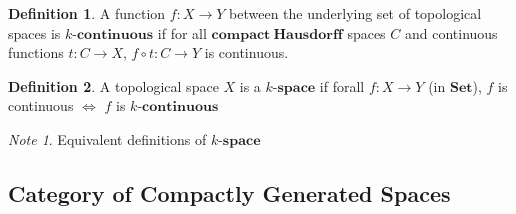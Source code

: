 \documentclass[a4paper]{article}
\theoremstyle{plain}
\theoremstyle{definition}
\newtheorem{defn}{Definition}[section]
\theoremstyle{remark}
\newtheorem*{note}{Note}
\newcommand{\mbf}[1]{\mathbf{#1}}
\begin{document}
    \begin{defn}
        A function $f : X \to Y$ between the underlying set of topological spaces
        is $k\mbf{\text{-}continuous}$ if for all $\mbf{compact\ Hausdorff}$ spaces $C$
        and continuous functions $t : C \to X$, $f \circ t : C \to Y$ is continuous. 
    \end{defn}

    \begin{defn}
        A topological space $X$ is a $k\mbf{\text{-}space}$ if forall $f : X \to Y$ (in $\mbf{Set}$),
        $f$ is continuous $\Leftrightarrow$ $f$ is $k\mbf{\text{-}continuous}$
    \end{defn}

    \begin{note}
        Equivalent definitions of $k\mbf{\text{-}space}$ 
    \end{note}

    \subsection{Category of Compactly Generated Spaces}


    
    
\end{document}
